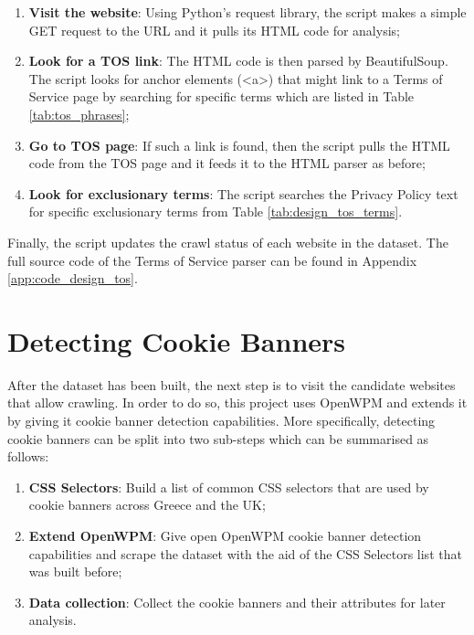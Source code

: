 \documentclass[../main.tex]{subfiles}
\begin{document}
\begin{enumerate}
    \item \textbf{Visit the website}: Using Python’s request library, the script makes a simple GET request to the URL and it pulls its HTML code for analysis;
    
    \item \textbf{Look for a TOS link}: The HTML code is then parsed by BeautifulSoup. The script looks for anchor elements (<a>) that might link to a Terms of Service page by searching for specific terms which are listed in Table \ref{tab:tos_phrases};

    \item \textbf{Go to TOS page}: If such a link is found, then the script pulls the HTML code from the TOS page and it feeds it to the HTML parser as before;

    \item \textbf{Look for exclusionary terms}: The script searches the Privacy Policy text for specific exclusionary terms from Table \ref{tab:design_tos_terms}.
\end{enumerate}

Finally, the script updates the crawl status of each website in the dataset. The full source code of the Terms of Service parser can be found in Appendix \ref{app:code_design_tos}.

\section{Detecting Cookie Banners}
After the dataset has been built, the next step is to visit the candidate websites that allow crawling. In order to do so, this project uses OpenWPM and extends it by giving it cookie banner detection capabilities. More specifically, detecting cookie banners can be split into two sub-steps which can be summarised as follows:

\begin{enumerate}
    \item \textbf{CSS Selectors}: Build a list of common CSS selectors that are used by cookie banners across Greece and the UK;

    \item \textbf{Extend OpenWPM}: Give open OpenWPM cookie banner detection capabilities and scrape the dataset with the aid of the CSS Selectors list that was built before; 

    \item \textbf{Data collection}: Collect the cookie banners and their attributes for later analysis.
\end{enumerate}
\end{document}

